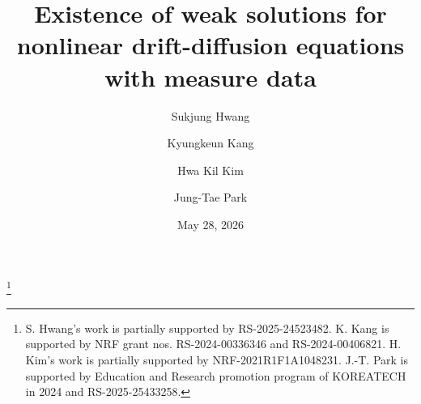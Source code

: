 \documentclass{amsart}
\numberwithin{equation}{section}
\begin{document}
\title[Existence of PME with measure and drifts]{Existence of weak solutions for nonlinear drift-diffusion equations with measure data}
%

\author[S. Hwang]{Sukjung Hwang}
\address{S. Hwang: Department of Mathematics Education, Chungbuk National University, Cheongju 28644, Republic of Korea}

\author[K. Kang]{Kyungkeun Kang}
\address{K. Kang: Department of Mathematics, Yonsei University,  Seoul 03722, Republic of Korea}


\author[H.K. Kim]{Hwa Kil Kim}
\address{H.K. Kim: Department of Mathematics Education, Hannam University, Daejeon 34430, Republic of Korea}

\author[J.-T. Park]{Jung-Tae Park}
\address{J.-T. Park: School of Liberal Arts, Korea University of Technology and Education, Cheonan 31253, Republic of Korea; and Korea Institute for Advanced Study, Seoul 02455, Republic of Korea}


\thanks{
S. Hwang's work is partially supported by RS-2025-24523482. K. Kang is supported by NRF grant nos. RS-2024-00336346 and RS-2024-00406821. H. Kim's work is partially supported by NRF-2021R1F1A1048231. J.-T. Park is supported by Education and Research promotion program of KOREATECH in 2024 and RS-2025-25433258.}

\date{May 28, 2026}


\makeatletter
{}
\makeatother
{}


\end{document}
